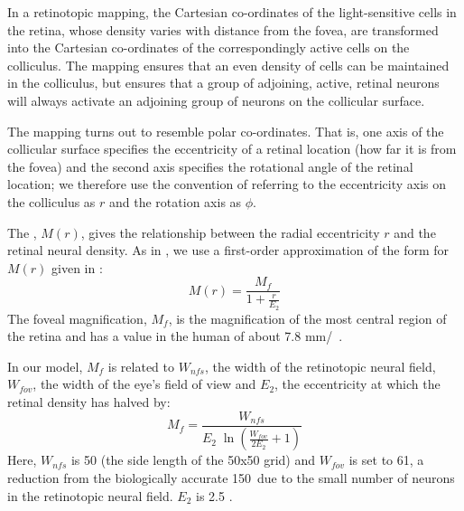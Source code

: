 \documentclass{frontiersSCNS}
\begin{document}
In a retinotopic mapping, the Cartesian co-ordinates of the
light-sensitive cells in the retina, whose density varies with
distance from the fovea, are transformed into the Cartesian
co-ordinates of the correspondingly active cells on the
colliculus. The mapping ensures that an even density of cells can be
maintained in the colliculus, but ensures that a group of adjoining,
active, retinal neurons will always activate an adjoining group of
neurons on the collicular surface.

The mapping turns out to resemble polar co-ordinates. That is, one
axis of the collicular surface specifies the eccentricity of a retinal
location (how far it is from the fovea) and the second axis specifies
the rotational angle of the retinal location; we therefore use the
convention of referring to the eccentricity axis on the colliculus as
$r$ and the rotation axis as $\phi$.

The , $M(r)$, gives the relationship
between the radial eccentricity $r$ and the retinal neural density. As
in
\cite{cope_basal_2017}, we use a first-order approximation of the form
for $M(r)$ given in \cite{rovamo_estimation_1979}:
\begin{equation} \label{eq:cmf}
M(r) = \frac{M_f}{1+\frac{r}{E_2}}
\end{equation}
The foveal magnification, $M_f$, is the magnification of the most
central region of the retina and has a value in the human of about 7.8
mm/\dg~\citep{rovamo_estimation_1979}.

In our model, $M_f$ is related to $W_{nfs}$, the width of the
retinotopic neural field, $W_{fov}$, the width of the eye's field of
view and $E_2$, the eccentricity at which the retinal density has
halved by:
\begin{equation} \label{eq:fm}
   M_f = \frac {W_{nfs}} {E_2\;\ln\left(\frac{W_{fov}}{2 E_2} + 1\right)}
\end{equation}
Here, $W_{nfs}$ is 50 (the side length of the 50x50 grid) and
$W_{fov}$ is set to 61\dg, a reduction from the biologically accurate
150\dg~due to the small number of neurons in the retinotopic neural
field. $E_2$ is
2.5 \citep{cope_basal_2017,slotnick_electrophysiological_2001}.

\end{document}
